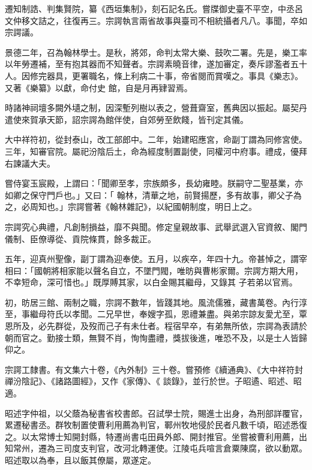 \begin{pinyinscope}
 遷知制誥、判集賢院，纂《西垣集制》，刻石記名氏。嘗牒御史臺不平空，中丞呂文仲移文詰之，往復再三。宗諤執言兩省故事與臺司不相統攝者凡八。事聞，卒如宗諤議。



 景德二年，召為翰林學士。是秋，將郊，命判太常大樂、鼓吹二署。先是，樂工率以年勞遷補，至有抱其器而不知聲者。宗諤素曉音律，遂加審定，奏斥謬濫者五十人。因修完器具，更署職名，條上利病二十事，帝省閱而賞嘆之。事具《樂志》。又著《樂纂》以獻，命付史
 館，自是月再肄習焉。



 時諸神祠壇多闕外壝之制，因深塹列樹以表之，營葺齋室，舊典因以振起。屬契丹遣使來賀承天節，詔宗諤為館伴使，自郊勞至飲餞，皆刊定其儀。



 大中祥符初，從封泰山，改工部郎中。二年，始建昭應宮，命副丁謂為同修宮使。三年，知審官院。屬祀汾陰后土，命為經度制置副使，同權河中府事。禮成，優拜右諫議大夫。



 嘗侍宴玉宸殿，上謂曰：「聞卿至孝，宗族頗多，長幼雍睦。朕嗣守二聖基業，亦如卿之保守門戶也。」又曰：「
 翰林，清華之地，前賢揚歷，多有故事，卿父子為之，必周知也。」宗諤嘗著《翰林雜記》，以紀國朝制度，明日上之。



 宗諤究心典禮，凡創制損益，靡不與聞。修定皇親故事、武舉武選入官資敘、閣門儀制、臣僚導從、貢院條貫，餘多裁正。



 五年，迎真州聖像，副丁謂為迎奉使。五月，以疾卒，年四十九。帝甚悼之，謂宰相曰：「國朝將相家能以聲名自立，不墜門閥，唯昉與曹彬家爾。宗諤方期大用，不幸短命，深可惜也。」既厚賻其家，以白金賜其繼母，又錄其
 子若弟以官焉。



 初，昉居三館、兩制之職，宗諤不數年，皆踐其地。風流儒雅，藏書萬卷。內行淳至，事繼母符氏以孝聞。二兄早世，奉嫂字孤，恩禮兼盡。與弟宗諒友愛尤至，覃恩所及，必先群從，及歿而己子有未仕者。程宿早卒，有弟無所依，宗諤為表請於朝而官之。勤接士類，無賢不肖，恂恂盡禮，獎拔後進，唯恐不及，以是士人皆歸仰之。



 宗諤工隸書。有文集六十卷，《內外制》三十卷。嘗預修《續通典》、《大中祥符封禪汾陰記》、《諸路圖經》，又作《家傳》、《
 談錄》，並行於世。子昭遹、昭述、昭適。



 昭述字仲祖，以父蔭為秘書省校書郎。召試學士院，賜進士出身，為刑部詳覆官，累遷秘書丞。群牧制置使曹利用薦為判官，鄆州牧地侵於民者凡數千頃，昭述悉復之。以太常博士知開封縣，特遷尚書屯田員外郎、開封推官。坐嘗被曹利用薦，出知常州，遷為三司度支判官，改河北轉運使。江陵屯兵喧言倉粟陳腐，欲以動眾。昭述取以為奉，且以飯其僚屬，眾遂定。




\end{pinyinscope}
